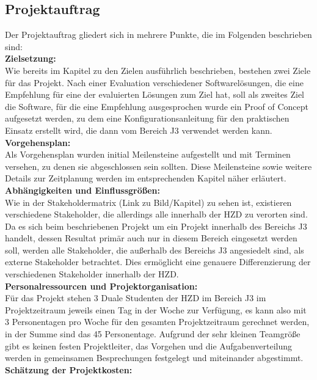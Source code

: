 \documentclass[ThesisDJ.tex]{subfiles}
\begin{document}
	
	\subsection{Projektauftrag}
	
	Der Projektauftrag gliedert sich in mehrere Punkte, die im Folgenden beschrieben sind:\bigskip\\
	\textbf{Zielsetzung:}\medskip\\
	Wie bereits im Kapitel zu den Zielen ausführlich beschrieben, bestehen zwei Ziele für das Projekt. Nach einer Evaluation verschiedener Softwarelösungen, die eine Empfehlung für eine der evaluierten Lösungen zum Ziel hat, soll als zweites Ziel die Software, für die eine Empfehlung ausgesprochen wurde ein Proof of Concept aufgesetzt werden, zu dem eine Konfigurationsanleitung für den praktischen Einsatz erstellt wird, die dann vom Bereich J3 verwendet werden kann.\bigskip\\
	\textbf{Vorgehensplan:}\medskip\\
	Als Vorgehensplan wurden initial Meilensteine aufgestellt und mit Terminen versehen, zu denen sie abgeschlossen sein sollten. Diese Meilensteine sowie weitere Details zur Zeitplanung werden im entsprechenden Kapitel näher erläutert.\bigskip\\
	\textbf{Abhängigkeiten und Einflussgrößen:}	\medskip\\
	Wie in der Stakeholdermatrix (Link zu Bild/Kapitel) zu sehen ist, existieren verschiedene Stakeholder, die allerdings alle innerhalb der HZD zu verorten sind. Da es sich beim beschriebenen Projekt um ein Projekt innerhalb des Bereichs J3 handelt, dessen Resultat primär auch nur in diesem Bereich eingesetzt werden soll, werden alle Stakeholder, die außerhalb des Bereichs J3 angesiedelt sind, als externe Stakeholder betrachtet. Dies ermöglicht eine genauere Differenzierung der verschiedenen Stakeholder innerhalb der HZD.\bigskip\\
	\textbf{Personalressourcen und Projektorganisation:}\medskip\\
	Für das Projekt stehen 3 Duale Studenten der HZD im Bereich J3 im Projektzeitraum jeweils einen Tag in der Woche zur Verfügung, es kann also mit 3 Personentagen pro Woche für den gesamten Projektzeitraum gerechnet werden, in der Summe sind das 45 Personentage.
	Aufgrund der sehr kleinen Teamgröße gibt es keinen festen Projektleiter, das Vorgehen und die Aufgabenverteilung werden in gemeinsamen Besprechungen festgelegt und miteinander abgestimmt.\bigskip\\
	\textbf{Schätzung der Projektkosten:}\medskip\\
\end{document}
